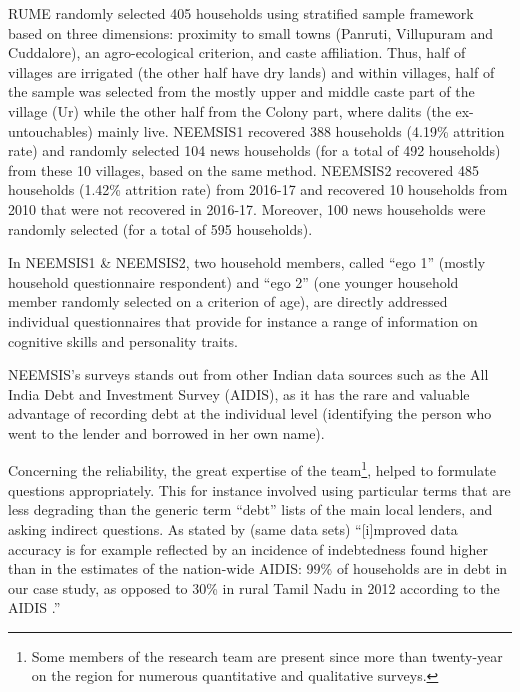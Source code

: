 \documentclass[a4paper, 11pt, onecolumn]{article}
\begin{document}
RUME randomly selected 405 households using stratified sample framework based on three dimensions: proximity to small towns (Panruti, Villupuram and Cuddalore), an agro-ecological criterion, and caste affiliation.
Thus, half of villages are irrigated (the other half have dry lands) and within villages, half of the sample was selected from the mostly upper and middle caste part of the village (Ur) while the other half from the Colony part, where dalits (the ex-untouchables)  mainly live. 
NEEMSIS1 recovered 388 households (4.19\% attrition rate) and randomly selected 104 news households (for a total of 492 households) from these 10 villages, based on the same method. 
NEEMSIS2 recovered 485 households (1.42\% attrition rate) from 2016-17 and recovered 10 households from 2010 that were not recovered in 2016-17.
Moreover, 100 news households were randomly selected (for a total of 595 households).

In NEEMSIS1 \& NEEMSIS2, two household members, called ``ego 1'' (mostly household questionnaire respondent) and ``ego 2'' (one younger household member randomly selected on a criterion of age), are directly addressed individual questionnaires that provide for instance a range of information on cognitive skills and personality traits.

NEEMSIS's surveys stands out from other Indian data sources such as the All India Debt and Investment Survey (AIDIS), as it has the rare and valuable advantage of recording debt at the individual level (identifying the person who went to the lender and borrowed in her own name).

Concerning the reliability, the great expertise of the team\footnote{Some members of the research team are present since more than twenty-year on the region for numerous quantitative and qualitative surveys.}, helped to formulate questions appropriately.
This for instance involved using particular terms that are less degrading than the generic term ``debt'' lists of the main local lenders, and asking indirect questions.
As stated by \cite{Reboul2021} (same data sets) ``[i]mproved data accuracy is for example reflected by an incidence of indebtedness found higher than in the estimates of the nation-wide AIDIS: 99\% of households are in debt in our case study, as opposed to 30\% in rural Tamil Nadu in 2012 according to the AIDIS \citep{NSSO2014}.'' 
\end{document}
